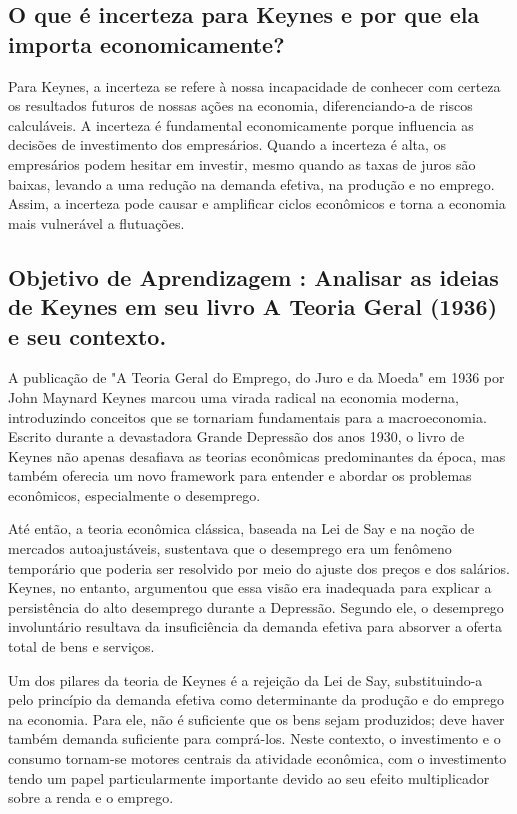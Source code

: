 \documentclass[12pt]{article}
\begin{document}
\subsection{\textbf{O que é incerteza para Keynes e por que ela importa economicamente?}}
 Para Keynes, a incerteza se refere à nossa incapacidade de conhecer com certeza os resultados futuros de nossas ações na economia, diferenciando-a de riscos calculáveis. A incerteza é fundamental economicamente porque influencia as decisões de investimento dos empresários. Quando a incerteza é alta, os empresários podem hesitar em investir, mesmo quando as taxas de juros são baixas, levando a uma redução na demanda efetiva, na produção e no emprego. Assim, a incerteza pode causar e amplificar ciclos econômicos e torna a economia mais vulnerável a flutuações.
\subsection{\textbf{Objetivo de Aprendizagem : Analisar as ideias de Keynes em seu livro A Teoria Geral (1936) e seu contexto.}}
A publicação de "A Teoria Geral do Emprego, do Juro e da Moeda" em 1936 por John Maynard Keynes marcou uma virada radical na economia moderna, introduzindo conceitos que se tornariam fundamentais para a macroeconomia. Escrito durante a devastadora Grande Depressão dos anos 1930, o livro de Keynes não apenas desafiava as teorias econômicas predominantes da época, mas também oferecia um novo framework para entender e abordar os problemas econômicos, especialmente o desemprego.

Até então, a teoria econômica clássica, baseada na Lei de Say e na noção de mercados autoajustáveis, sustentava que o desemprego era um fenômeno temporário que poderia ser resolvido por meio do ajuste dos preços e dos salários. Keynes, no entanto, argumentou que essa visão era inadequada para explicar a persistência do alto desemprego durante a Depressão. Segundo ele, o desemprego involuntário resultava da insuficiência da demanda efetiva para absorver a oferta total de bens e serviços.

Um dos pilares da teoria de Keynes é a rejeição da Lei de Say, substituindo-a pelo princípio da demanda efetiva como determinante da produção e do emprego na economia. Para ele, não é suficiente que os bens sejam produzidos; deve haver também demanda suficiente para comprá-los. Neste contexto, o investimento e o consumo tornam-se motores centrais da atividade econômica, com o investimento tendo um papel particularmente importante devido ao seu efeito multiplicador sobre a renda e o emprego.
\end{document}
